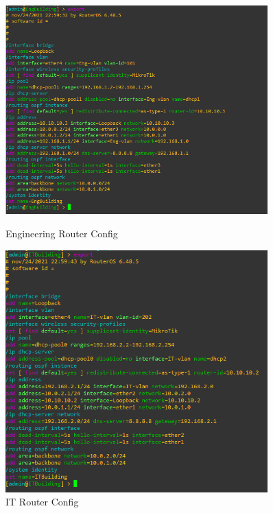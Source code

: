 \documentclass{article}
\begin{document}
		\begin{figure}[h!]
			\centering
			\begin{minipage}{0.5\textwidth}
				\centering
				\includegraphics[width=0.9\textwidth]{eng_router_config}
				\caption{Engineering Router Config}
			\end{minipage}%
			\begin{minipage}{0.5\textwidth}
				\centering
				\includegraphics[width=0.9\textwidth]{it_router_config}
				\caption{IT Router Config}
			\end{minipage}
		\end{figure}
		\newpage
\end{document}
